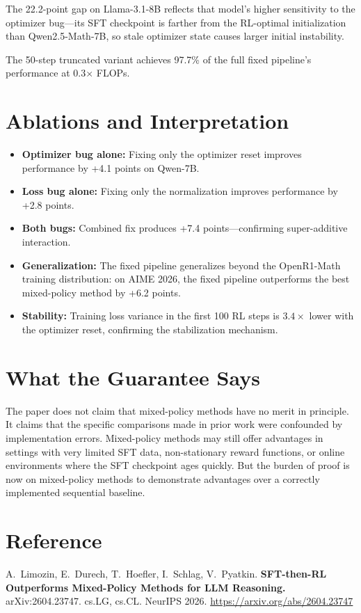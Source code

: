 \documentclass[10pt,twocolumn]{article}
\begin{document}
The 22.2-point gap on Llama-3.1-8B reflects that model's higher sensitivity to the optimizer bug---its SFT checkpoint is farther from the RL-optimal initialization than Qwen2.5-Math-7B, so stale optimizer state causes larger initial instability.

The 50-step truncated variant achieves 97.7\% of the full fixed pipeline's performance at 0.3$\times$ FLOPs.

\section{Ablations and Interpretation}

\begin{itemize}[leftmargin=1em,itemsep=2pt]
  \item \textbf{Optimizer bug alone:} Fixing only the optimizer reset improves performance by +4.1 points on Qwen-7B.
  \item \textbf{Loss bug alone:} Fixing only the normalization improves performance by +2.8 points.
  \item \textbf{Both bugs:} Combined fix produces +7.4 points---confirming super-additive interaction.
  \item \textbf{Generalization:} The fixed pipeline generalizes beyond the OpenR1-Math training distribution: on AIME 2026, the fixed pipeline outperforms the best mixed-policy method by +6.2 points.
  \item \textbf{Stability:} Training loss variance in the first 100 RL steps is $3.4\times$ lower with the optimizer reset, confirming the stabilization mechanism.
\end{itemize}

\section{What the Guarantee Says}

The paper does not claim that mixed-policy methods have no merit in principle.
It claims that the specific comparisons made in prior work were confounded by implementation errors.
Mixed-policy methods may still offer advantages in settings with very limited SFT data, non-stationary reward functions, or online environments where the SFT checkpoint ages quickly.
But the burden of proof is now on mixed-policy methods to demonstrate advantages over a correctly implemented sequential baseline.

\section*{Reference}
A.\ Limozin, E.\ Durech, T.\ Hoefler, I.\ Schlag, V.\ Pyatkin.
\textbf{SFT-then-RL Outperforms Mixed-Policy Methods for LLM Reasoning.}
arXiv:2604.23747. cs.LG, cs.CL. NeurIPS 2026.
\url{https://arxiv.org/abs/2604.23747}
\end{document}

